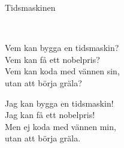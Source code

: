 \begin{song}{Tidsmaskinen}
	
	
	\\
	
	
	Vem kan bygga en tidsmaskin?\\
	Vem kan få ett nobelpris?\\
	Vem kan koda med vännen sin,\\
	utan att börja gräla?
	
	Jag kan bygga en tidsmaskin!\\
	Jag kan få ett nobelpris!\\
	Men ej koda med vännen min,\\
	utan att börja gräla.
	
\end{song}
